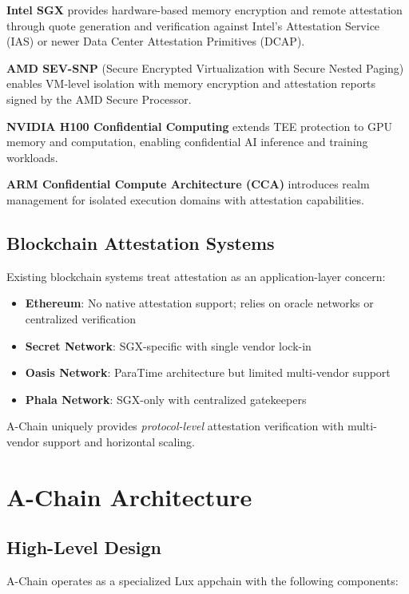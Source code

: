 \documentclass[11pt,a4paper]{article}
\begin{document}
\textbf{Intel SGX} provides hardware-based memory encryption and remote attestation through quote generation and verification against Intel's Attestation Service (IAS) or newer Data Center Attestation Primitives (DCAP).

\textbf{AMD SEV-SNP} (Secure Encrypted Virtualization with Secure Nested Paging) enables VM-level isolation with memory encryption and attestation reports signed by the AMD Secure Processor.

\textbf{NVIDIA H100 Confidential Computing} extends TEE protection to GPU memory and computation, enabling confidential AI inference and training workloads.

\textbf{ARM Confidential Compute Architecture (CCA)} introduces realm management for isolated execution domains with attestation capabilities.

\subsection{Blockchain Attestation Systems}

Existing blockchain systems treat attestation as an application-layer concern:

\begin{itemize}
\item \textbf{Ethereum}: No native attestation support; relies on oracle networks or centralized verification
\item \textbf{Secret Network}: SGX-specific with single vendor lock-in
\item \textbf{Oasis Network}: ParaTime architecture but limited multi-vendor support
\item \textbf{Phala Network}: SGX-only with centralized gatekeepers
\end{itemize}

A-Chain uniquely provides \textit{protocol-level} attestation verification with multi-vendor support and horizontal scaling.

\section{A-Chain Architecture}

\subsection{High-Level Design}

A-Chain operates as a specialized Lux appchain with the following components:
\end{document}
